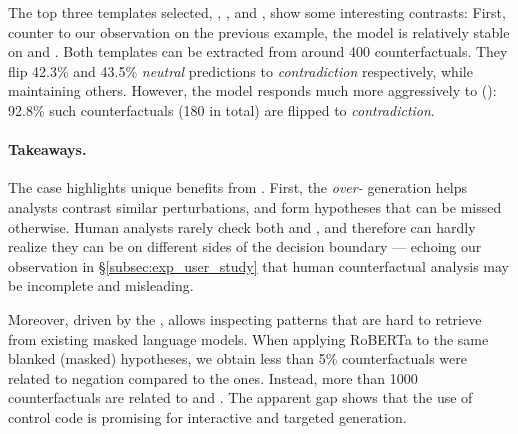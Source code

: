 The top three templates selected, , , and , show some interesting contrasts: 
First, counter to our observation on the previous example, the model is relatively stable on  and .
Both templates can be extracted from around 400 counterfactuals.
They flip 42.3\% and 43.5\% \emph{neutral} predictions to \emph{contradiction} respectively, while maintaining others.
However, the model responds much more aggressively to  (): 92.8\% such counterfactuals (180 in total) are flipped to \emph{contradiction}.


\paragraph{Takeaways.}
The case highlights unique benefits from \sysname.
First, the \emph{over-} generation helps analysts contrast similar perturbations, and form hypotheses that can be missed otherwise.
Human analysts rarely check both  and , and therefore can hardly realize they can be on different sides of the decision boundary --- echoing our observation in \S\ref{subsec:exp_user_study} that human counterfactual analysis may be incomplete and misleading.

Moreover, driven by the \tagstrs, \sysname allows inspecting patterns that are hard to retrieve from existing masked language models.
When applying RoBERTa to the same blanked (masked) hypotheses, we obtain less than 5\% counterfactuals were related to negation compared to the \sysname ones.
Instead, more than 1000 counterfactuals are related to \texttt{} and \texttt{}.
The apparent gap shows that the use of control code is promising for interactive and targeted generation.

